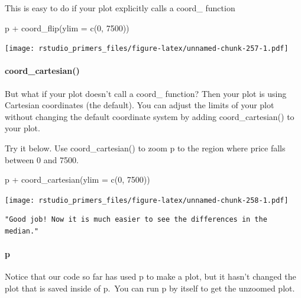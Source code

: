 \documentclass[
]{article}
\newenvironment{Shaded}{\begin{snugshade}}{\end{snugshade}}
\newcommand{\AttributeTok}[1]{\textcolor[rgb]{0.77,0.63,0.00}{#1}}
\newcommand{\DecValTok}[1]{\textcolor[rgb]{0.00,0.00,0.81}{#1}}
\newcommand{\FunctionTok}[1]{\textcolor[rgb]{0.00,0.00,0.00}{#1}}
\newcommand{\NormalTok}[1]{#1}
\newcommand{\SpecialCharTok}[1]{\textcolor[rgb]{0.00,0.00,0.00}{#1}}
\begin{document}
This is easy to do if your plot explicitly calls a coord\_ function

\begin{Shaded}
\begin{Highlighting}[]
\NormalTok{p }\SpecialCharTok{+} \FunctionTok{coord\_flip}\NormalTok{(}\AttributeTok{ylim =} \FunctionTok{c}\NormalTok{(}\DecValTok{0}\NormalTok{, }\DecValTok{7500}\NormalTok{))}
\end{Highlighting}
\end{Shaded}

\texttt{[image: rstudio\_primers\_files/figure-latex/unnamed-chunk-257-1.pdf]}

\hypertarget{coord_cartesian}{%
\paragraph{coord\_cartesian()}\label{coord_cartesian}}

But what if your plot doesn't call a coord\_ function? Then your plot is
using Cartesian coordinates (the default). You can adjust the limits of
your plot without changing the default coordinate system by adding
coord\_cartesian() to your plot.

Try it below. Use coord\_cartesian() to zoom p to the region where price
falls between 0 and 7500.

\begin{Shaded}
\begin{Highlighting}[]
\NormalTok{p }\SpecialCharTok{+} \FunctionTok{coord\_cartesian}\NormalTok{(}\AttributeTok{ylim =} \FunctionTok{c}\NormalTok{(}\DecValTok{0}\NormalTok{, }\DecValTok{7500}\NormalTok{))}
\end{Highlighting}
\end{Shaded}

\texttt{[image: rstudio\_primers\_files/figure-latex/unnamed-chunk-258-1.pdf]}

\begin{verbatim}
"Good job! Now it is much easier to see the differences in the median."
\end{verbatim}

\hypertarget{p}{%
\paragraph{p}\label{p}}

Notice that our code so far has used p to make a plot, but it hasn't
changed the plot that is saved inside of p.~You can run p by itself to
get the unzoomed plot.
\end{document}

